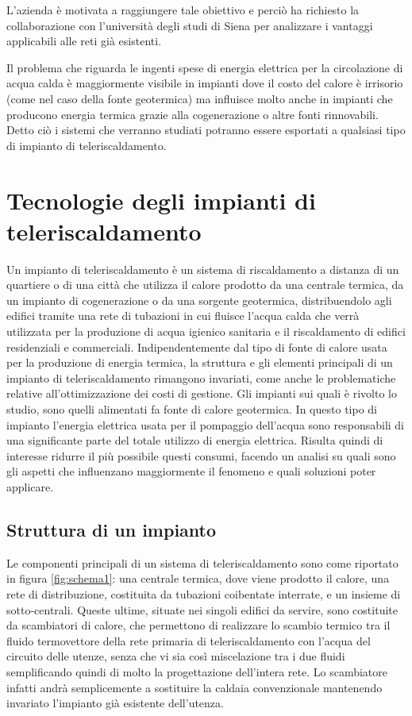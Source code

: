 \documentclass[laurea,oneside,11pt]{USiena_tesiLM}
\begin{document}
L'azienda è motivata a raggiungere tale obiettivo e perciò ha richiesto la collaborazione con l'università degli studi di Siena per analizzare i vantaggi applicabili alle reti già esistenti.

Il problema che riguarda le ingenti spese di energia elettrica per la circolazione di acqua calda è maggiormente visibile in impianti dove il costo del calore è irrisorio (come nel caso della fonte geotermica) ma influisce molto anche in impianti che producono energia termica grazie alla cogenerazione o altre fonti rinnovabili. Detto ciò i sistemi che verranno studiati potranno essere esportati a qualsiasi tipo di impianto di teleriscaldamento.


\chapter{Tecnologie degli impianti di teleriscaldamento}
Un impianto di teleriscaldamento è un  sistema di riscaldamento a distanza di un quartiere o di una città 
che utilizza il calore prodotto da una centrale termica, da un impianto di cogenerazione o da una sorgente geotermica, distribuendolo agli edifici tramite una rete di tubazioni in cui fluisce l'acqua calda che verrà utilizzata per la produzione di acqua igienico sanitaria e il riscaldamento di edifici residenziali e commerciali. Indipendentemente dal tipo di fonte di calore usata per la produzione di energia termica, la struttura e gli elementi principali di un impianto di teleriscaldamento rimangono invariati, come anche le problematiche relative all'ottimizzazione dei costi di gestione. Gli impianti sui quali è rivolto lo studio, sono quelli alimentati fa fonte di calore geotermica. In questo tipo di impianto l'energia elettrica usata per il pompaggio dell'acqua sono responsabili di una significante parte del totale utilizzo di energia elettrica. Risulta quindi di interesse ridurre il più possibile questi consumi, facendo un analisi su quali sono gli aspetti che influenzano maggiormente il fenomeno e quali soluzioni poter applicare. 

\section{Struttura di un impianto}
Le componenti principali di un sistema di teleriscaldamento sono come riportato in figura \ref{fig:schema1}: una centrale termica, dove viene prodotto il calore, una rete di distribuzione, costituita da tubazioni 
coibentate interrate, e un insieme di sotto-centrali. Queste ultime, situate nei singoli 
edifici da servire, sono costituite da scambiatori di calore, che permettono di realizzare 
lo scambio termico tra il fluido termovettore  della rete primaria di teleriscaldamento con l'acqua del circuito delle utenze, senza che vi sia così miscelazione tra i due fluidi semplificando quindi di molto la progettazione dell'intera rete. Lo scambiatore infatti andrà semplicemente a sostituire la  caldaia convenzionale mantenendo invariato l'impianto già esistente dell'utenza.
\end{document}
